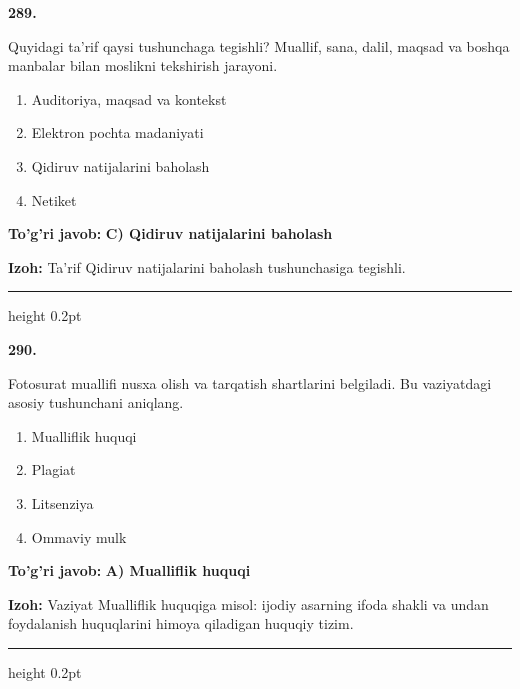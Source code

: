 \documentclass[10pt,a4paper,oneside]{article}
\begin{document}
\noindent\textbf{\color{ink}289.}
\par
Quyidagi ta'rif qaysi tushunchaga tegishli? Muallif, sana, dalil, maqsad va boshqa manbalar bilan moslikni tekshirish jarayoni.
\begin{enumerate}[label=\Alph*),leftmargin=9mm]
\item Auditoriya, maqsad va kontekst
\item Elektron pochta madaniyati
\item Qidiruv natijalarini baholash
\item Netiket
\end{enumerate}
\begin{tcolorbox}[enhanced,breakable,colback=teal!4,colframe=teal!50!black,boxrule=0.5pt,arc=1.1mm,left=3mm,right=3mm,top=1.7mm,bottom=1.7mm,before skip=2mm,after skip=2mm]
\textbf{\color{teal}To'g'ri javob:} \textbf{C) Qidiruv natijalarini baholash}
\par\smallskip
\textbf{Izoh:} Ta'rif Qidiruv natijalarini baholash tushunchasiga tegishli.
\end{tcolorbox}
\vspace{2mm}\hrule height 0.2pt \vspace{3mm}

\noindent\textbf{\color{ink}290.}
\par
Fotosurat muallifi nusxa olish va tarqatish shartlarini belgiladi. Bu vaziyatdagi asosiy tushunchani aniqlang.
\begin{enumerate}[label=\Alph*),leftmargin=9mm]
\item Mualliflik huquqi
\item Plagiat
\item Litsenziya
\item Ommaviy mulk
\end{enumerate}
\begin{tcolorbox}[enhanced,breakable,colback=teal!4,colframe=teal!50!black,boxrule=0.5pt,arc=1.1mm,left=3mm,right=3mm,top=1.7mm,bottom=1.7mm,before skip=2mm,after skip=2mm]
\textbf{\color{teal}To'g'ri javob:} \textbf{A) Mualliflik huquqi}
\par\smallskip
\textbf{Izoh:} Vaziyat Mualliflik huquqiga misol: ijodiy asarning ifoda shakli va undan foydalanish huquqlarini himoya qiladigan huquqiy tizim.
\end{tcolorbox}
\vspace{2mm}\hrule height 0.2pt \vspace{3mm}
\end{document}
